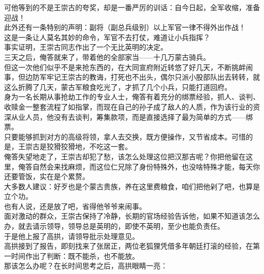 \begin{multicols}{\theparacolNo}
可他等到的不是王崇古的夸奖，却是一番严厉的训话：自今日起，全军收缩，准备迎战！\\

此外还有一条特别的声明：副将（副总兵级别）以上军官一律不得外出作战！\\

这是一条让人莫名其妙的命令，军官不去打仗，难道让小兵指挥？\\

事实证明，王崇古同志作出了一个无比英明的决定。\\

三天之后，俺答就来了，带着他的全部家当——十几万蒙古骑兵。\\

但这一次他们似乎不是来抢东西的，在大同宣府附近转悠了好几天，不断挑衅闹事，但边防军牢记王崇古的教诲，打死也不出头，偶尔只派小股部队出去转转，就这么折腾了几天，蒙古军粮食吃光了，才抓了几个小兵，只能打道回府。\\

身为一名长期从事抢劫工作的专业人士，俺答有着充分的绑票经验，抓人、谈判、收赎金一整套流程了如指掌，而现在自己的孙子成了敌人的人质，作为该行业的资深从业人员，他没有去谈判，筹集款项，而是直接选择了最为简单的方式——绑票。\\

只要能够抓到对方的高级将领，拿人去交换，既方便操作，又节省成本。可惜的是，王崇古是狡猾狡猾地，不吃这一套。\\

俺答失望地走了，王崇古却犯了愁，该怎么处理这位把汉那吉呢？你把他留在这里，俺答自然会来找麻烦，而这位仁兄除了身份特殊外，也没啥特殊才能，每天你还要管饭，实在是个累赘。\\

大多数人建议：好歹也是个蒙古贵族，养在这里费粮食，咱们把他剁了吧，也算是立个功。\\

也有人说，还是放了吧，省得他爷爷来闹事。\\

面对激动的群众，王崇古保持了冷静，长期的官场经验告诉他，如果不知道该怎么办，就去请示领导，领导总是英明的，即使不英明，至少也能负责任。\\

于是他上报了高拱，请领导批示处理意见。\\

高拱接到了报告，即刻找来了张居正，两位老狐狸凭借多年朝廷打滚的经验，在第一时间作出了判断：既不能杀，也不能放。\\

那该怎么办呢？在长时间思考之后，高拱眼睛一亮：\\


\end{multicols}
